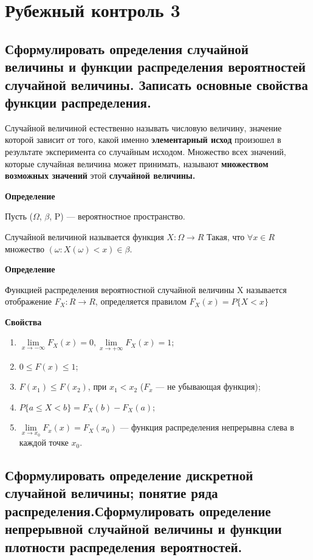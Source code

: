 \section{Рубежный контроль 3}

\subsection{Сформулировать определения случайной величины и функции распределения вероятностей случайной величины. Записать основные свойства функции распределения.}

Случайной величиной естественно называть числовую величину, значение которой зависит от того, какой именно \textbf{элементарный исход} произошел в результате эксперимента со случайным исходом.
Множество всех значений, которые случайная величина может принимать, называют \textbf{множеством возможных значений} этой \textbf{случайной величины.}

\textbf{Определение}

Пусть ($\Omega$, $\beta$, P) --- вероятностное пространство.

Случайной величиной называется функция $X : \Omega \rightarrow R$
Такая, что $\forall x \in R$ множество $(\omega : X (\omega) < x) \in \beta$.

\textbf{Определение}

Функцией распределения вероятностной случайной величины X называется отображение $F_X : R \rightarrow R$, определяется правилом $F_X(x) = P\{X < x\}$

\textbf{Свойства}

\begin{enumerate}[label=\arabic*.]
	\item $\lim\limits_{x \rightarrow -\infty}F_X(x) = 0, \lim\limits_{x \rightarrow +\infty}F_X(x) = 1$;
	\item $0 \leq F(x) \leq 1$;
	\item $F(x_1) \leq F(x_2)$, при $x_1 < x_2$ ($F_x$ --- не убывающая функция);
	\item $P\{a \leq X < b\} = F_X(b) - F_X(a)$;
	\item $\lim\limits_{x \rightarrow x_0}F_x(x) = F_X(x_0)$ --- функция распределения непрерывна слева в каждой точке $x_0$.
\end{enumerate}

\subsection{Сформулировать определение дискретной случайной величины; понятие ряда распределения.Сформулировать определение непрерывной случайной величины и функции плотности распределения вероятностей.}

